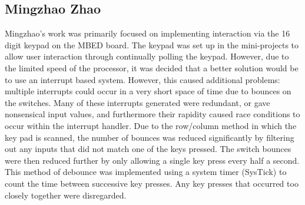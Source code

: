 \subsection*{Mingzhao Zhao}
Mingzhao's work was primarily focused on implementing interaction via 
the 16 digit keypad on the MBED board. The keypad was set up in the mini-projects 
to allow user interaction through continually polling the keypad. However, due 
to the limited speed of the processor, it was decided that a better solution 
would be to use an interrupt based system.
However, this caused additional problems: 
multiple interrupts could occur in a very short space of time due to bounces on 
the switches. Many of these interrupts generated were redundant, or gave 
nonsensical input values, and furthermore their rapidity caused race conditions 
to occur within the interrupt handler. 
Due to the row/column method in which the key pad is scanned, the 
number of bounces was reduced significantly by filtering out any inputs that 
did not match one of the keys pressed. The switch bounces were then reduced 
further by only allowing a single key press every half a second. 
This method of debounce was implemented using a system 
timer (SysTick) to count the time between successive key presses. Any key 
presses that occurred too closely together were disregarded. 

